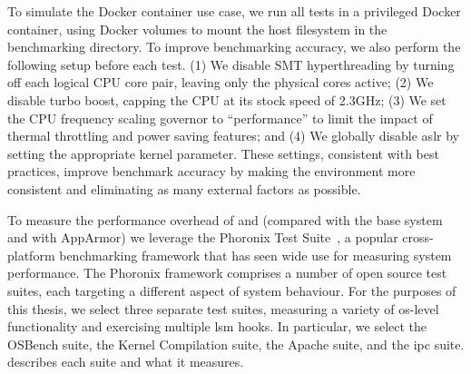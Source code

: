 To simulate the Docker container use case, we run all tests in a privileged Docker
container, using Docker volumes to mount the host filesystem in the benchmarking
directory. To improve benchmarking accuracy, we also perform the following setup before
each test. (1) We disable SMT hyperthreading by turning off each logical CPU core pair,
leaving only the physical cores active; (2) We disable turbo boost, capping the CPU at its
stock speed of 2.3GHz; (3) We set the CPU frequency scaling governor to
\enquote{performance} to limit the impact of thermal throttling and power saving features;
and (4) We globally disable \gls{aslr} by setting the appropriate kernel parameter. These
settings, consistent with best practices, improve benchmark accuracy by making the
environment more consistent and eliminating as many external factors as possible.

To measure the performance overhead of \bpfbox{} and \bpfcontain{} (compared with the base
system and with AppArmor) we leverage the Phoronix Test Suite~\cite{phoronix}, a popular
cross-platform benchmarking framework that has seen wide use for measuring system
performance. The Phoronix framework comprises a number of open source test suites, each
targeting a different aspect of system behaviour. For the purposes of this thesis, we
select three separate test suites, measuring a variety of \gls{os}-level functionality and
exercising multiple \gls{lsm} hooks. In particular, we select the OSBench suite, the
Kernel Compilation suite, the Apache suite, and the \gls{ipc} suite. 
describes each suite and what it measures.

